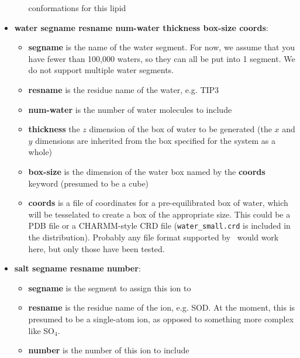 \documentclass[12pt]{article}
\begin{document}
\begin{itemize}
\begin{itemize}
             conformations for this lipid
          \end{itemize}
    \item {\bf water segname resname num-water thickness box-size coords}:
          \begin{itemize}
             \item {\bf segname} is the name of the water segment.  For now,
             we assume that you have fewer than 100,000 waters, so they can
             all be put into 1 segment.  We do not support multiple water
             segments.
             \item {\bf resname} is the residue name of the water, e.g. TIP3
             \item {\bf num-water} is the number of water molecules to
             include
             \item {\bf thickness} the $z$ dimension of the box of water to be
             generated (the $x$ and $y$ dimensions are inherited from the box
             specified for the system as a whole)
             \item {\bf box-size} is the dimension of the water box named by
             the {\bf coords} keyword (presumed to be a cube)
             \item {\bf coords} is a file of coordinates for a
             pre-equilibrated box of water, which will be tesselated to
             create a box of the appropriate size.  This could be a PDB file or
             a CHARMM-style CRD file ({\tt water\_small.crd} is included in the
             distribution).  Probably any file format supported by
             \loos\ would work here, but only those have been tested.
          \end{itemize}
     \item {\bf salt segname resname number}:
          \begin{itemize}
            \item {\bf segname} is the segment to assign this ion to
            \item {\bf resname} is the residue name of the ion, e.g. SOD.  At
            the moment, this is presumed to be a single-atom ion, as opposed
            to something more complex like SO$_4$.
            \item {\bf number} is the number of this ion to include
          \end{itemize}

\end{itemize}
\end{document}
